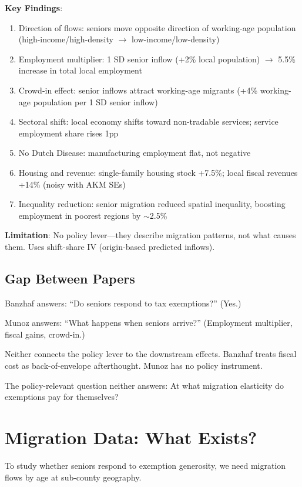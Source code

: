 \documentclass[11pt]{article}
\begin{document}
\textbf{Key Findings}:
\begin{enumerate}
    \item Direction of flows: seniors move opposite direction of working-age population (high-income/high-density $\to$ low-income/low-density)
    \item Employment multiplier: 1 SD senior inflow (+2\% local population) $\to$ 5.5\% increase in total local employment
    \item Crowd-in effect: senior inflows attract working-age migrants (+4\% working-age population per 1 SD senior inflow)
    \item Sectoral shift: local economy shifts toward non-tradable services; service employment share rises 1pp
    \item No Dutch Disease: manufacturing employment flat, not negative
    \item Housing and revenue: single-family housing stock +7.5\%; local fiscal revenues +14\% (noisy with AKM SEs)
    \item Inequality reduction: senior migration reduced spatial inequality, boosting employment in poorest regions by $\sim$2.5\%
\end{enumerate}

\textbf{Limitation}: No policy lever---they describe migration patterns, not what causes them. Uses shift-share IV (origin-based predicted inflows).

\subsection{Gap Between Papers}

Banzhaf answers: ``Do seniors respond to tax exemptions?'' (Yes.)

Munoz answers: ``What happens when seniors arrive?'' (Employment multiplier, fiscal gains, crowd-in.)

Neither connects the policy lever to the downstream effects. Banzhaf treats fiscal cost as back-of-envelope afterthought. Munoz has no policy instrument.

The policy-relevant question neither answers: At what migration elasticity do exemptions pay for themselves?

\section{Migration Data: What Exists?}

To study whether seniors respond to exemption generosity, we need migration flows by age at sub-county geography.
\end{document}

